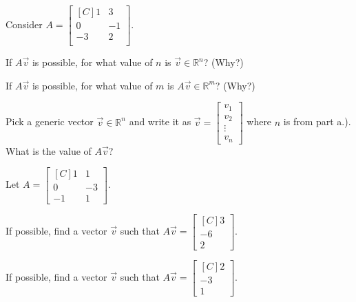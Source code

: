 \begin{exercise} Consider
$A=\begin{bmatrix*}[C]
1 & 3  \\
0 & -1 \\
-3 & 2 \\ 
\end{bmatrix*}$.\\
\begin{inparaenum}[a.)]
\item If $A\vec{v}$ is possible, for what value of $n$ is 
$\vec{v} \in \mathbb{R}^n$? (Why?)\\
%
\item If $A\vec{v}$ is possible, for what value of $m$ is 
$A\vec{v} \in \mathbb{R}^m$? (Why?)\\
%
\item Pick a generic vector $\vec{v} \in \mathbb{R}^n$ and write it as 
$\vec{v}=\begin{bmatrix}v_1 \\ v_2 \\ \vdots \\ v_n\end{bmatrix}$ where 
$n$ is from part a.). What is the value of $A\vec{v}$?
\end{inparaenum}
\end{exercise}

\begin{exercise}
Let $A=\begin{bmatrix*}[C]
1 & 1  \\
0 & -3  \\
-1 & 1  
\end{bmatrix*}$.\\
\begin{inparaenum}
\item If possible, find a vector $\vec{v}$ such that 
$A\vec{v}=\begin{bmatrix*}[C] 3 \\ -6 \\ 2\end{bmatrix*}$.\\
%
\item If possible, find a vector $\vec{v}$ such that 
$A\vec{v}=\begin{bmatrix*}[C] 2 \\ -3 \\ 1\end{bmatrix*}$.
\end{inparaenum}
\end{exercise}

